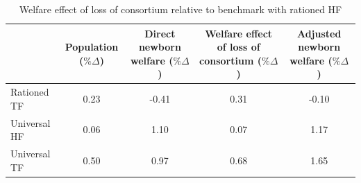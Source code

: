 \begin{table}[H]
\centering
\caption{Welfare effect of loss of consortium relative to benchmark with rationed HF}
\label{tab:loss_of_consortium}
\begin{tabular}{lcccc}
\toprule
 & \makecell{Population \\ ($\% \Delta$)}
 & \makecell{Direct newborn\\ welfare ($\% \Delta$)} 
 & \makecell{Welfare effect of\\ loss of consortium ($\% \Delta$)} 
 & \makecell{Adjusted newborn\\ welfare ($\% \Delta$)} \\
\midrule
Rationed TF & 0.23 & -0.41 &  0.31 & -0.10 \\
Universal HF & 0.06 & 1.10 & 0.07 & 1.17  \\
Universal TF & 0.50 & 0.97 & 0.68 & 1.65 \\
\bottomrule
\bottomrule
\end{tabular}
\end{table}
